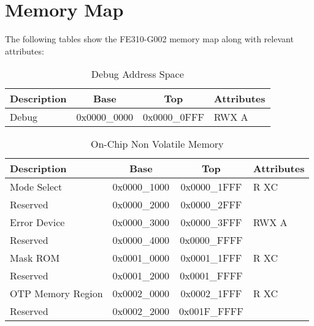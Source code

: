 \documentclass[a4paper,12pt,twoside]{report}
\begin{document}
            \section{Memory Map}
            	The following tables show the FE310-G002 memory map along with relevant attributes:\cite{fe310g002manMMap}
            	
            	\begin{table}[H]
            		\centering
            		\begin{tabular}{| p{3cm} | c | c | p{3cm} |}
            			\hline
            			\textbf{Description} & \textbf{Base} & \textbf{Top} & \textbf{Attributes}\\
            			\hline
            			\hline
            			Debug & 0x0000\_0000 & 0x0000\_0FFF & RWX A\\
            			\hline
            		\end{tabular}
            		\caption{Debug Address Space}
            	\end{table}
            
            	\begin{table}[H]
            		\centering
            		\begin{tabular}{| p{4cm} | c | c | p{3cm} |}
            			\hline
            			\textbf{Description} & \textbf{Base} & \textbf{Top} & \textbf{Attributes}\\
            			\hline
            			Mode Select & 0x0000\_1000 & 0x0000\_1FFF & R XC\\
            			Reserved & 0x0000\_2000 & 0x0000\_2FFF & \\
            			Error Device & 0x0000\_3000 & 0x0000\_3FFF & RWX A\\
            			Reserved & 0x0000\_4000 & 0x0000\_FFFF & \\
            			Mask ROM & 0x0001\_0000 & 0x0001\_1FFF & R XC\\
            			Reserved & 0x0001\_2000 & 0x0001\_FFFF & \\
            			OTP Memory Region & 0x0002\_0000 & 0x0002\_1FFF & R XC\\
            			Reserved & 0x0002\_2000 & 0x001F\_FFFF & \\
            			\hline
            		\end{tabular}
            		\caption{On-Chip Non Volatile Memory}
            	\end{table}
\end{document}
